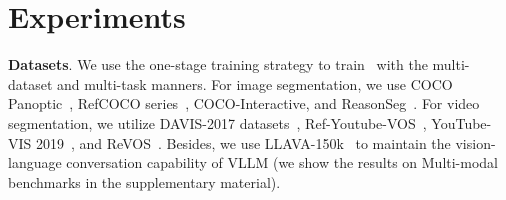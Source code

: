 \begin{table}[t]
  \centering
  \caption{ Results of common video segmentation benchmarks, including DAVIS17, Ref-YouTube-VOS, Ref-DAVIS17, and YouTube-VIS 2019. $\ddagger$ denotes the same meaning as Tab. \ref{tab:ref}.
  }

\vspace{-3mm}
  
\label{tab:exp-video}
\end{table}
\section{Experiments}
\textbf{Datasets}.
We use the one-stage training strategy to train \name~with the multi-dataset and multi-task manners. For image segmentation, we use COCO Panoptic~\cite{Lin2014MicrosoftCC}, RefCOCO series~\cite{yu2016modeling,nagaraja2016modeling}, COCO-Interactive, and ReasonSeg~\cite{Lai2023LISARS}.
For video segmentation, we utilize DAVIS-2017 datasets~\cite{caelles20182018}, Ref-Youtube-VOS~\cite{seo2020urvos}, YouTube-VIS 2019~\cite{yang2019video}, and ReVOS~\cite{yan2024visa}. Besides, we use LLAVA-150k~\cite{liu2024visual} to maintain the vision-language conversation capability of VLLM (we show the results on Multi-modal benchmarks in the supplementary material).

